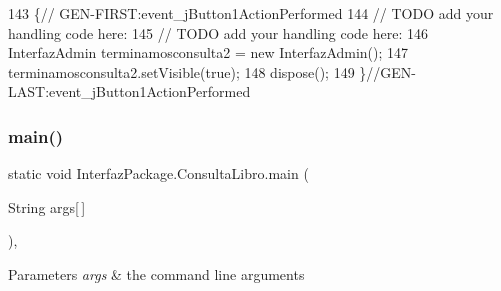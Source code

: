 \begin{DoxyCode}
143                                                                          \{\textcolor{comment}{//
      GEN-FIRST:event\_jButton1ActionPerformed}
144         \textcolor{comment}{// TODO add your handling code here:}
145         \textcolor{comment}{// TODO add your handling code here:}
146         InterfazAdmin terminamosconsulta2 = \textcolor{keyword}{new} InterfazAdmin();
147         terminamosconsulta2.setVisible(\textcolor{keyword}{true});
148         dispose();
149     \}\textcolor{comment}{//GEN-LAST:event\_jButton1ActionPerformed}
\end{DoxyCode}
\mbox{\label{class_interfaz_package_1_1_consulta_libro_a848bb4a72481885fa6f42b8431beadee}} 
\subsubsection{\texorpdfstring{main()}{main()}}
{\footnotesize\ttfamily static void Interfaz\+Package.\+Consulta\+Libro.\+main (\begin{DoxyParamCaption}\item[{String}]{args\mbox{[}$\,$\mbox{]} }\end{DoxyParamCaption})\hspace{0.3cm}{\ttfamily [inline]}, {\ttfamily [static]}}


\begin{DoxyParams}{Parameters}
{\em args} & the command line arguments \\
\hline
\end{DoxyParams}

